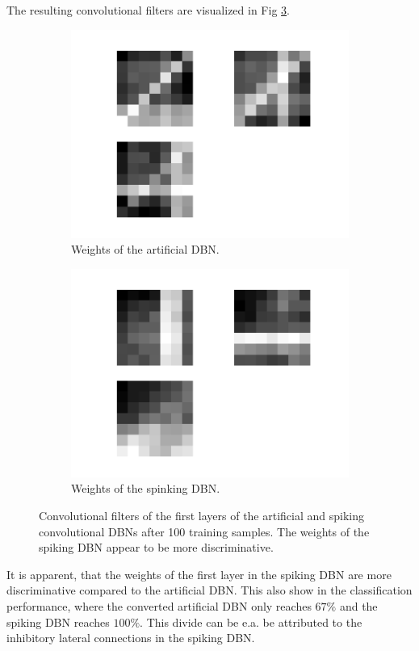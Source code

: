The resulting convolutional filters are visualized in Fig \ref{fig:convvsnoconv}. 

 \begin{figure}[h!]
	\centering
	\begin{subfigure}[t]{.45\textwidth}
  		\centering
  		\includegraphics[width=.9\linewidth]{imgs/vs/w_rbm.png}
  		\caption{Weights of the artificial DBN.}
  		\label{fig:sub1}
	\end{subfigure}%
	\begin{subfigure}[t]{.45\textwidth}
  		\centering
  		\includegraphics[width=.9\linewidth]{imgs/vs/w_spike.png}
  		\caption{Weights of the spinking DBN.}
  		\label{fig:sub2}
	\end{subfigure}
	\caption[Convolutional filters of the first layers of the artificial and spiking convolutional DBNs.]{Convolutional filters of the first layers of the artificial and spiking convolutional DBNs after 100 training samples. The weights of the spiking DBN appear to be more discriminative.}
	\label{fig:convvsnoconv}
\end{figure}

It is apparent, that the weights of the first layer in the spiking DBN are more discriminative compared to the artificial DBN.
This also show in the classification performance, where the converted artificial DBN only reaches $67 \%$ and the spiking DBN reaches $100 \%$.
This divide can be e.a. be attributed to the inhibitory lateral connections in the spiking DBN.  
